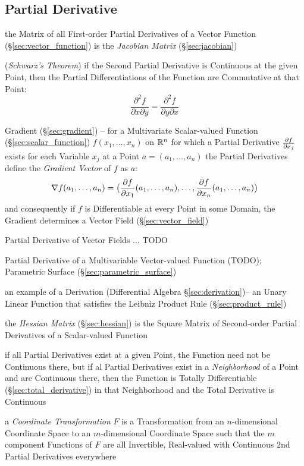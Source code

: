 {\subsection{Partial Derivative}\label{sec:partial_derivative}

the Matrix of all First-order Partial Derivatives of a Vector Function
(\S\ref{sec:vector_function}) is the \emph{Jacobian Matrix}
(\S\ref{sec:jacobian})

(\emph{Schwarz's Theorem}) if the Second Partial Derivative is Continuous at the
given Point, then the Partial Differentiations of the Function are Commutative
at that Point:
\[
  \frac{\partial^2f}{\partial{x}\partial{y}}
    = \frac{\partial^2f}{\partial{y}\partial{x}}
\]

Gradient (\S\ref{sec:gradient}) -- for a Multivariate Scalar-valued Function
(\S\ref{sec:scalar_function}) $f(x_1, \ldots, x_n)$ on $\mathbb{R}^n$ for which a
Partial Derivative $\frac{\partial{f}}{\partial{x_j}}$ exists for each Variable $x_j$ at a Point
$a = (a_1, \ldots, a_n)$ the Partial Derivatives define the \emph{Gradient
  Vector} of $f$ as $a$:
\[
  \nabla{f}(a_1, \ldots, a_n) = \big( \frac{\partial{f}}{\partial{x_1}}(a_1, \ldots, a_n), \ldots,
  \frac{\partial{f}}{\partial{x_n}}(a_1, \ldots, a_n) \big)
\]
and consequently if $f$ is Differentiable at every Point in some Domain, the
Gradient determines a Vector Field (\S\ref{sec:vector_field})

Partial Derivative of Vector Fields ... TODO

Partial Derivative of a Multivariable Vector-valued Function (TODO); Parametric
Surface (\S\ref{sec:parametric_surface})

an example of a Derivation (Differential Algebra \S\ref{sec:derivation})-- an
Unary Linear Function that satisfies the Leibniz Product Rule
(\S\ref{sec:product_rule})

the \emph{Hessian Matrix} (\S\ref{sec:hessian}) is the Square Matrix of
Second-order Partial Derivatives of a Scalar-valued Function

if all Partial Derivatives exist at a given Point, the Function need not be
Continuous there, but if al Partial Derivatives exist in a \emph{Neighborhood}
of a Point and are Continuous there, then the Function is Totally Differentiable
(\S\ref{sec:total_derivative}) in that Neighborhood and the Total Derivative is
Continuous

\fist a \emph{Coordinate Transformation} $F$ is a Transformation from an
$n$-dimensional Coordinate Space to an $m$-dimensional Coordinate Space such
that the $m$ component Functions of $F$ are all Invertible, Real-valued with
Continuous $2$nd Partial Derivatives everywhere

}
